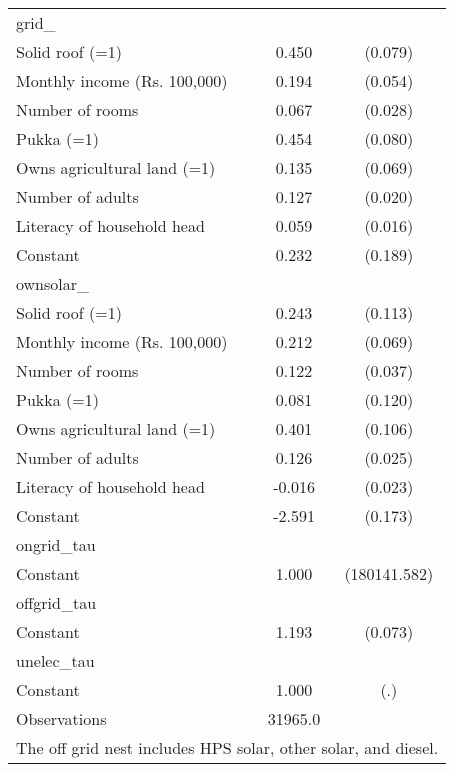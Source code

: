 \begin{table}[htbp]
{\begin{tabular}{l*{1}{cc}}
\midrule
grid\_               &                     &            \\
Solid roof (=1)     &       0.450\sym{***}&     (0.079)\\
Monthly income (Rs. 100,000)&       0.194\sym{***}&     (0.054)\\
Number of rooms     &       0.067\sym{**} &     (0.028)\\
Pukka (=1)          &       0.454\sym{***}&     (0.080)\\
Owns agricultural land (=1)&       0.135\sym{**} &     (0.069)\\
Number of adults    &       0.127\sym{***}&     (0.020)\\
Literacy of household head&       0.059\sym{***}&     (0.016)\\
Constant            &       0.232         &     (0.189)\\
\midrule
ownsolar\_           &                     &            \\
Solid roof (=1)     &       0.243\sym{**} &     (0.113)\\
Monthly income (Rs. 100,000)&       0.212\sym{***}&     (0.069)\\
Number of rooms     &       0.122\sym{***}&     (0.037)\\
Pukka (=1)          &       0.081         &     (0.120)\\
Owns agricultural land (=1)&       0.401\sym{***}&     (0.106)\\
Number of adults    &       0.126\sym{***}&     (0.025)\\
Literacy of household head&      -0.016         &     (0.023)\\
Constant            &      -2.591\sym{***}&     (0.173)\\
\midrule
ongrid\_tau          &                     &            \\
Constant            &       1.000         &(180141.582)\\
\midrule
offgrid\_tau         &                     &            \\
Constant            &       1.193\sym{***}&     (0.073)\\
\midrule
unelec\_tau          &                     &            \\
Constant            &       1.000         &         (.)\\
\midrule
Observations        &     31965.0         &            \\
\bottomrule
\multicolumn{3}{l}{\footnotesize The off grid nest includes HPS solar, other solar, and diesel.}\\
\end{tabular}}
\end{table}
